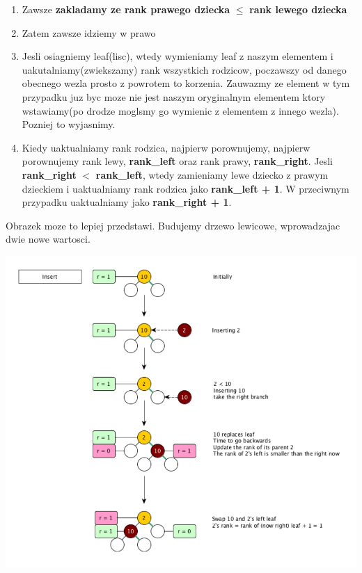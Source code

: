 \documentclass{article}
\begin{document}
\begin{tcolorbox}[colback=white!90!blue,colframe=black!35!blue,title=]

    \begin{enumerate}[label=(\arabic*)]
        \item Zawsze \textbf{zakladamy ze rank prawego dziecka} $\leq$ \textbf{rank lewego dziecka}
        \item Zatem zawsze idziemy w prawo
        \item Jesli osiagniemy leaf(lisc), wtedy wymieniamy leaf z naszym elementem i uakutalniamy(zwiekszamy) rank wszystkich rodzicow, poczawszy od danego obecnego wezla prosto z powrotem to korzenia. Zauwazmy ze element w tym przypadku juz byc moze nie jest naszym oryginalnym elementem ktory wstawiamy(po drodze moglsmy go wymienic z elementem z innego wezla). Pozniej to wyjasnimy.
        \item Kiedy uaktualniamy rank rodzica, najpierw porownujemy, najpierw porownujemy rank lewy, \textbf{rank\_left} oraz rank prawy, \textbf{rank\_right}. Jesli \textbf{rank\_right} $<$ \textbf{rank\_left}, wtedy zamieniamy lewe dziecko z prawym dzieckiem i uaktualniamy rank rodzica jako \textbf{rank\_left + 1}. W przeciwnym przypadku uaktualniamy jako \textbf{rank\_right + 1}. 
    \end{enumerate}

\end{tcolorbox}

\vspace{10cm}

Obrazek moze to lepiej przedstawi. Budujemy drzewo lewicowe, wprowadzajac dwie nowe wartosci.

\begin{center}
    \begin{minipage}[h]{0.8\textwidth}
        \centering
        \includegraphics[width=1.0\textwidth]{insert_leftist.png}
    \end{minipage}    
\end{center}
\end{document}
